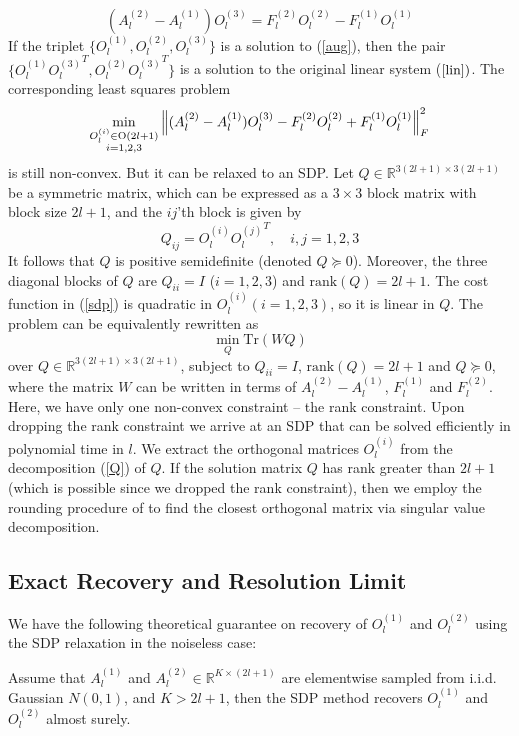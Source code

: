 \begin{equation}\label{aug}
(A_l^{(2)}-A_l^{(1)})O_l^{(3)}=F_l^{(2)}O_l^{(2)}-F_l^{(1)}O_l^{(1)}
\end{equation}
If the triplet $\{O_l^{(1)},O_l^{(2)},O_l^{(3)}\}$ is a solution to (\ref{aug}),
then the pair $\{O_l^{(1)}{O_l^{(3)}}^T, O_l^{(2)}{O_l^{(3)}}^T\}$
is a solution to the original linear system ($\ref{lin})$. The corresponding
least squares problem
\begin{equation}\label{sdp}
\min_{%
      \substack{%
        O_l^{(i)}\in \text{O}(2l+1) \\ i=1,2,3
}
      }
\left\|(A_l^{(2)}-A_l^{(1)})O_l^{(3)}-F_l^{(2)}O_l^{(2)}+F_l^{(1)}O_l^{(1)} \right\|_F^2
\end{equation}
is still non-convex. But it can be relaxed to an SDP. Let $Q \in
\mathbb{R}^{3(2l+1) \times 3(2l+1)}$ be a symmetric matrix, which can be
expressed as a $3 \times 3$ block matrix with block size $2l+1$, and the $ij$'th block is given by
\begin{equation}
\label{Q}
Q_{ij}=O_l^{(i)}{O_l^{(j)}}^T, \quad i,j=1,2,3
\end{equation}
It follows that $Q$ is positive semidefinite (denoted $Q \succeq 0$). Moreover, the three diagonal blocks of $Q$ are $Q_{ii}=I$ ($i=1,2,3$) and
$\text{rank}(Q)=2l+1$.
The cost
function in (\ref{sdp}) is quadratic in $O_l^{(i)} (i=1,2,3)$, so it is
linear in $Q$. The problem can be equivalently rewritten as
\begin{equation}
\min_Q \text{Tr}(WQ)
\end{equation}
over $Q \in \mathbb{R}^{3(2l+1) \times 3(2l+1)}$,
subject to $Q_{ii} = I$,  $\text{rank}(Q) = 2l+1$ and $Q \succeq 0$,
where the matrix $W$ can be written in terms of $A_l^{(2)}-A_l^{(1)}$,
$F_l^{(1)}$ and $F_l^{(2)}$. Here, we have only one non-convex constraint -- the
rank constraint. Upon dropping the rank constraint we arrive at an SDP that can be solved efficiently in
polynomial time in $l$. We extract
the orthogonal matrices
$O_l^{(i)}$ from the decomposition (\ref{Q}) of $Q$. If the
solution matrix $Q$ has rank greater than $2l+1$ (which is possible since we
dropped the rank constraint), then
we employ the rounding procedure of \cite{Cheeger} to find the closest orthogonal matrix via singular value decomposition.  

\subsection{Exact Recovery and Resolution Limit}
We have the following theoretical guarantee on recovery of $O_l^{(1)}$ and $O_l^{(2)}$ using the SDP relaxation in the noiseless case:  
\begin{thm}\label{thm:recovery}
Assume that $A_l^{(1)}$ and $A_l^{(2)}\in\mathbb{R}^{K\times (2l+1)}$ are elementwise sampled from i.i.d. Gaussian $N(0,1)$, and $K>2l+1$, then the SDP method recovers $O_l^{(1)}$ and $O_l^{(2)}$ almost surely.
\end{thm}

